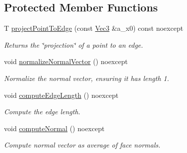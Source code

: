 \subsection*{Protected Member Functions}
\begin{DoxyCompactItemize}
\item 
T \hyperlink{classDcel_1_1EdgeT_ab937dca20cefcae4083b3cf873d83265}{project\+Point\+To\+Edge} (const \hyperlink{classDcel_1_1EdgeT_a93b8679cea557c419af44385ca6d356a}{Vec3} \&a\+\_\+x0) const noexcept
\begin{DoxyCompactList}\small\item\em Returns the \char`\"{}projection\char`\"{} of a point to an edge. \end{DoxyCompactList}\item 
\mbox{\label{classDcel_1_1EdgeT_aae9ee7375ce72ddf5ef375fb18863e8f}} 
void \hyperlink{classDcel_1_1EdgeT_aae9ee7375ce72ddf5ef375fb18863e8f}{normalize\+Normal\+Vector} () noexcept
\begin{DoxyCompactList}\small\item\em Normalize the normal vector, ensuring it has length 1. \end{DoxyCompactList}\item 
void \hyperlink{classDcel_1_1EdgeT_abddfe200f9af04cf49362d4ed1e8d37b}{compute\+Edge\+Length} () noexcept
\begin{DoxyCompactList}\small\item\em Compute the edge length. \end{DoxyCompactList}\item 
\mbox{\label{classDcel_1_1EdgeT_ad78566030a7781469035cc4b6ed3393b}} 
void \hyperlink{classDcel_1_1EdgeT_ad78566030a7781469035cc4b6ed3393b}{compute\+Normal} () noexcept
\begin{DoxyCompactList}\small\item\em Compute normal vector as average of face normals. \end{DoxyCompactList}\end{DoxyCompactItemize}
